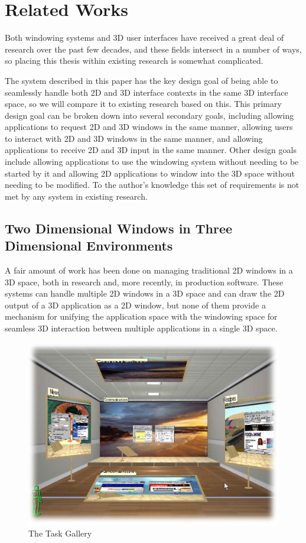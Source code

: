 \chapter{Related Works}
\label{sec:related-works}

Both windowing systems and 3D user interfaces have received a great deal of research over the past few decades, and these fields intersect in a number of ways, so placing this thesis within existing research is somewhat complicated. 

The system described in this paper has the key design goal of being able to seamlessly handle both 2D and 3D interface contexts in the same 3D interface space, so we will compare it to existing research based on this. This primary design goal can be broken down into several secondary goals, including allowing applications to request 2D and 3D windows in the same manner, allowing users to interact with 2D and 3D windows in the same manner, and allowing applications to receive 2D and 3D input in the same manner. Other design goals include allowing applications to use the windowing system without needing to be started by it and allowing 2D applications to window into the 3D space without needing to be modified. To the author's knowledge this set of requirements is not met by any system in existing research.

\section{Two Dimensional Windows in Three Dimensional Environments}
A fair amount of work has been done on managing traditional 2D windows in a 3D space, both in research and, more recently, in production software. These systems can handle multiple 2D windows in a 3D space and can draw the 2D output of a 3D application as a 2D window, but none of them provide a mechanism for unifying the application space with the windowing space for seamless 3D interaction between multiple applications in a single 3D space.

\begin{figure}[ht!]
\centering
\includegraphics[width=1.0\textwidth]{images/task_gallery.jpg}
\caption{The Task Gallery \protect\cite{task_gallery}}
\end{figure}


